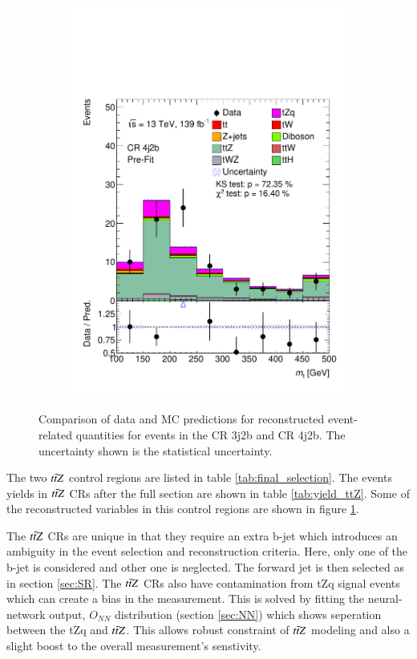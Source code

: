 \begin{figure}[h!]
\begin{subfigure}[b]{0.32\linewidth}
    \includegraphics[width=\linewidth]{ubonn-thesis/Chapters/Chapters_05/Figure/CR_ttZ/CR_4j2b_Top_mass.pdf} 
  \end{subfigure}
  \caption{Comparison of data and MC predictions for reconstructed event- related quantities for events in the CR 3j2b and CR 4j2b. The uncertainty shown is the statistical uncertainty.}
  \label{fig:ttZ}
  \end{figure}



The two $t\Bar{t}Z$ control regions are listed in table \ref{tab:final_selection}. The events yields in $t\Bar{t}Z$ CRs after the full section are shown in table \ref{tab:yield_ttZ}. Some of the reconstructed variables in this control regions are shown in figure \ref{fig:ttZ}.

The $t\Bar{t}Z$ CRs are unique in that they require an extra b-jet which introduces an ambiguity in the event selection and reconstruction criteria. Here, only one of the b-jet is considered and other one is neglected. The forward jet is then selected as in section \ref{sec:SR}. The $t\Bar{t}Z$ CRs also have contamination from tZq signal events which can create a bias in the measurement. This is solved by fitting the neural-network output, $O_{NN}$ distribution (section \ref{sec:NN}) which shows seperation between the tZq and $t\Bar{t}Z$. This allows robust constraint of $t\Bar{t}Z$ modeling and also a slight boost to the overall measurement’s senstivity.



